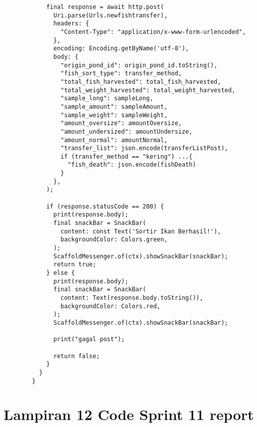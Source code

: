 \begin{lstlisting}
            final response = await http.post(
              Uri.parse(Urls.newfishtransfer),
              headers: {
                "Content-Type": "application/x-www-form-urlencoded",
              },
              encoding: Encoding.getByName('utf-8'),
              body: {
                "origin_pond_id": origin_pond_id.toString(),
                "fish_sort_type": transfer_method,
                "total_fish_harvested": total_fish_harvested,
                "total_weight_harvested": total_weight_harvested,
                "sample_long": sampleLong,
                "sample_amount": sampleAmount,
                "sample_weight": sampleWeight,
                "amount_oversize": amountOversize,
                "amount_undersized": amountUndersize,
                "amount_normal": amountNormal,
                "transfer_list": json.encode(transferListPost),
                if (transfer_method == "kering") ...{
                  "fish_death": json.encode(fishDeath)
                }
              },
            );
        
            if (response.statusCode == 200) {
              print(response.body);
              final snackBar = SnackBar(
                content: const Text('Sortir Ikan Berhasil!'),
                backgroundColor: Colors.green,
              );
              ScaffoldMessenger.of(ctx).showSnackBar(snackBar);
              return true;
            } else {
              print(response.body);
              final snackBar = SnackBar(
                content: Text(response.body.toString()),
                backgroundColor: Colors.red,
              );
              ScaffoldMessenger.of(ctx).showSnackBar(snackBar);
        
              print("gagal post");
        
              return false;
            }
          }
        }        
	\end{lstlisting}

	\clearpage
	\section{Lampiran 12 Code Sprint 11 report}

